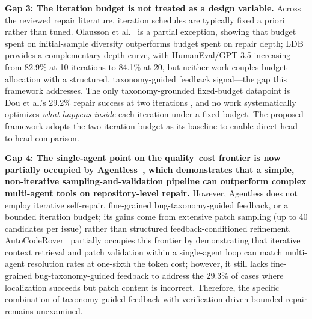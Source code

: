 \documentclass[10pt,a4paper]{article}
\begin{document}
\textbf{Gap 3: The iteration budget is not treated as a design variable.} Across the reviewed repair literature, iteration schedules are typically fixed a priori rather than tuned. Olausson et al.~\cite{olausson2024} is a partial exception, showing that budget spent on initial-sample diversity outperforms budget spent on repair depth; LDB~\cite{zhong2024ldb} provides a complementary depth curve, with HumanEval/GPT-3.5 increasing from 82.9\% at 10 iterations to 84.1\% at 20, but neither work couples budget allocation with a structured, taxonomy-guided feedback signal---the gap this framework addresses. The only taxonomy-grounded fixed-budget datapoint is Dou et al.'s 29.2\% repair success at two iterations \cite{dou2026}, and no work systematically optimizes \textit{what happens inside} each iteration under a fixed budget. The proposed framework adopts the two-iteration budget as its baseline to enable direct head-to-head comparison.

\textbf{Gap 4: The single-agent point on the quality--cost frontier is now partially occupied by Agentless~\cite{xia2025agentless}, which demonstrates that a simple, non-iterative sampling-and-validation pipeline can outperform complex multi-agent tools on repository-level repair.} However, Agentless does not employ iterative self-repair, fine-grained bug-taxonomy-guided feedback, or a bounded iteration budget; its gains come from extensive patch sampling (up to 40 candidates per issue) rather than structured feedback-conditioned refinement. AutoCodeRover~\cite{zhang2024autocoderover} partially occupies this frontier by demonstrating that iterative context retrieval and patch validation within a single-agent loop can match multi-agent resolution rates at one-sixth the token cost; however, it still lacks fine-grained bug-taxonomy-guided feedback to address the 29.3\% of cases where localization succeeds but patch content is incorrect. Therefore, the specific combination of taxonomy-guided feedback with verification-driven bounded repair remains unexamined.
\end{document}
